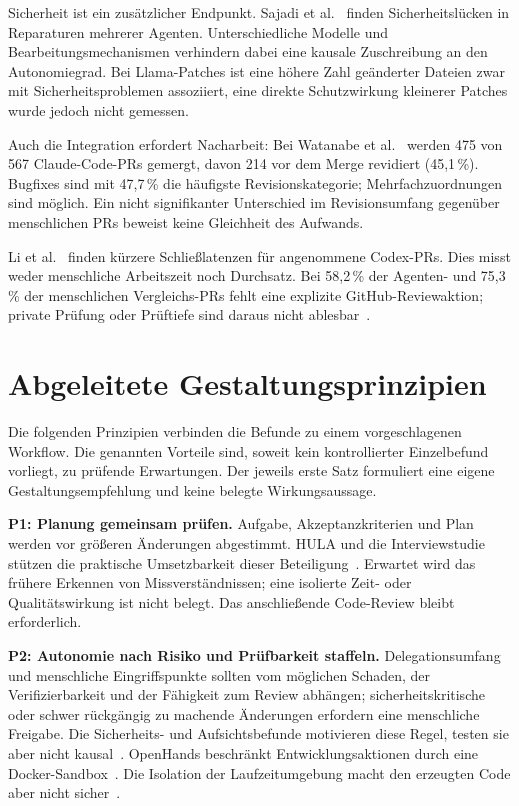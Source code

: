 \documentclass[conference]{IEEEtran}
\begin{document}
Sicherheit ist ein zusätzlicher Endpunkt. Sajadi et al.~\cite{sajadi2025patchsecurity} finden Sicherheitslücken in Reparaturen mehrerer Agenten. Unterschiedliche Modelle und Bearbeitungsmechanismen verhindern dabei eine kausale Zuschreibung an den Autonomiegrad. Bei Llama-Patches ist eine höhere Zahl geänderter Dateien zwar mit Sicherheitsproblemen assoziiert, eine direkte Schutzwirkung kleinerer Patches wurde jedoch nicht gemessen.

Auch die Integration erfordert Nacharbeit: Bei Watanabe et al.~\cite{watanabe2025agenticprs} werden 475 von 567 Claude-Code-PRs gemergt, davon 214 vor dem Merge revidiert (45,1\,\%). Bugfixes sind mit 47,7\,\% die häufigste Revisionskategorie; Mehrfachzuordnungen sind möglich. Ein nicht signifikanter Unterschied im Revisionsumfang gegenüber menschlichen PRs beweist keine Gleichheit des Aufwands.

Li et al.~\cite{li2025aidev} finden kürzere Schließlatenzen für angenommene Codex-PRs. Dies misst weder menschliche Arbeitszeit noch Durchsatz. Bei 58,2\,\% der Agenten- und 75,3\,\% der menschlichen Vergleichs-PRs fehlt eine explizite GitHub-Reviewaktion; private Prüfung oder Prüftiefe sind daraus nicht ablesbar~\cite{li2025aidev}.

\section{Abgeleitete Gestaltungsprinzipien}
Die folgenden Prinzipien verbinden die Befunde zu einem vorgeschlagenen Workflow. Die genannten Vorteile sind, soweit kein kontrollierter Einzelbefund vorliegt, zu prüfende Erwartungen. Der jeweils erste Satz formuliert eine eigene Gestaltungsempfehlung und keine belegte Wirkungsaussage.

\textbf{P1: Planung gemeinsam prüfen.}
Aufgabe, Akzeptanzkriterien und Plan werden vor größeren Änderungen abgestimmt. HULA und die Interviewstudie stützen die praktische Umsetzbarkeit dieser Beteiligung~\cite{takerngsaksiri2025hula,dhanorkar2026oversight}. Erwartet wird das frühere Erkennen von Missverständnissen; eine isolierte Zeit- oder Qualitätswirkung ist nicht belegt. Das anschließende Code-Review bleibt erforderlich.

\textbf{P2: Autonomie nach Risiko und Prüfbarkeit staffeln.}
Delegationsumfang und menschliche Eingriffspunkte sollten vom möglichen Schaden, der Verifizierbarkeit und der Fähigkeit zum Review abhängen; sicherheitskritische oder schwer rückgängig zu machende Änderungen erfordern eine menschliche Freigabe. Die Sicherheits- und Aufsichtsbefunde motivieren diese Regel, testen sie aber nicht kausal~\cite{sajadi2025patchsecurity,dhanorkar2026oversight}. OpenHands beschränkt Entwicklungsaktionen durch eine Docker-Sandbox~\cite{wang2025openhands}. Die Isolation der Laufzeitumgebung macht den erzeugten Code aber nicht sicher~\cite{sajadi2025patchsecurity}.
\end{document}
